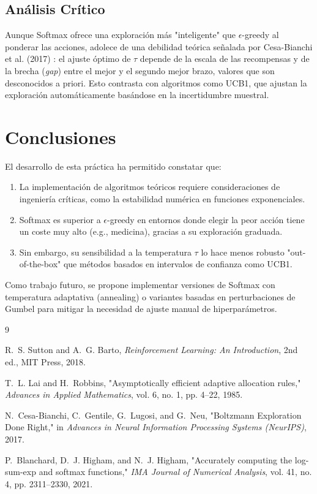 \documentclass[a4paper,11pt]{article}
\begin{document}
\subsection{Análisis Crítico}
Aunque Softmax ofrece una exploración más "inteligente" que $\epsilon$-greedy al ponderar las acciones, adolece de una debilidad teórica señalada por Cesa-Bianchi et al. (2017) \cite{cesa2017}: el ajuste óptimo de $\tau$ depende de la escala de las recompensas y de la brecha (\textit{gap}) entre el mejor y el segundo mejor brazo, valores que son desconocidos a priori. Esto contrasta con algoritmos como UCB1, que ajustan la exploración automáticamente basándose en la incertidumbre muestral.

\section{Conclusiones}

El desarrollo de esta práctica ha permitido constatar que:
\begin{enumerate}
    \item La implementación de algoritmos teóricos requiere consideraciones de ingeniería críticas, como la estabilidad numérica en funciones exponenciales.
    \item Softmax es superior a $\epsilon$-greedy en entornos donde elegir la peor acción tiene un coste muy alto (e.g., medicina), gracias a su exploración graduada.
    \item Sin embargo, su sensibilidad a la temperatura $\tau$ lo hace menos robusto "out-of-the-box" que métodos basados en intervalos de confianza como UCB1.
\end{enumerate}

Como trabajo futuro, se propone implementar versiones de Softmax con temperatura adaptativa (annealing) o variantes basadas en perturbaciones de Gumbel para mitigar la necesidad de ajuste manual de hiperparámetros.


\begin{thebibliography}{9}

R.~S. Sutton and A.~G. Barto,
\textit{Reinforcement Learning: An Introduction},
2nd ed., MIT Press, 2018.

T.~L. Lai and H.~Robbins,
"Asymptotically efficient adaptive allocation rules,"
\textit{Advances in Applied Mathematics}, vol. 6, no. 1, pp. 4--22, 1985.

N.~Cesa-Bianchi, C.~Gentile, G.~Lugosi, and G.~Neu,
"Boltzmann Exploration Done Right,"
in \textit{Advances in Neural Information Processing Systems (NeurIPS)}, 2017.

P.~Blanchard, D.~J. Higham, and N.~J. Higham,
"Accurately computing the log-sum-exp and softmax functions,"
\textit{IMA Journal of Numerical Analysis}, vol. 41, no. 4, pp. 2311--2330, 2021.

\end{thebibliography}
\end{document}
